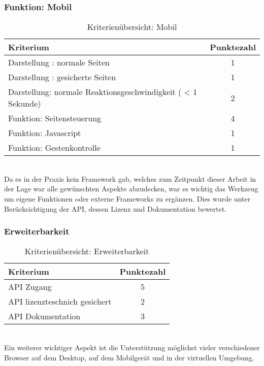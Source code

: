 \subsubsection{Funktion: Mobil}
\begin{table}[H]
 	\vspace{-30pt}
 	\centering
		\begin{tabular}{| p{12cm} | c|}
			\hline
				Kriterium		 &	Punktezahl\\
			\hline
			\hline
				Darstellung : normale Seiten			&1\\
				Darstellung : gesicherte Seiten		&	1	\\
				 Darstellung: normale Reaktionsgeschwindigkeit ( < 1 Sekunde)	&	2	\\
				Funktion: Seitensteuerung			&	4	\\
				Funktion: Javascript			&	1	\\
				Funktion: Gestenkontrolle			&	1	\\
				\hline
		\end{tabular}
	\caption{Kriterienübersicht: Mobil}
\end{table}

\\Da es in der Praxis kein Framework gab, welches zum Zeitpunkt dieser Arbeit in der Lage war alle gewünschten Aspekte abzudecken, war es wichtig das Werkzeug um eigene Funktionen oder externe Frameworks zu ergänzen. Dies wurde unter Berücksichtigung der API, dessen Lizenz und Dokumentation bewertet.
\subsubsection{Erweiterbarkeit}
\begin{table}[H]
 	\vspace{-30pt}
 	\centering
		\begin{tabular}{| p{12cm} | c|}
			\hline
				Kriterium		 &	Punktezahl\\
			\hline
			\hline
				API Zugang			&5\\
				API lizenzteschnich gesichert	&	2	\\
				API Dokumentation	&	3	\\
				\hline
		\end{tabular}
	\caption{Kriterienübersicht: Erweiterbarkeit}
\end{table}

\\Ein weiterer wichtiger Aspekt ist die Unterstützung möglichst vieler verschiedener Browser auf dem Desktop, auf dem Mobilgerät und in der virtuellen Umgebung.


